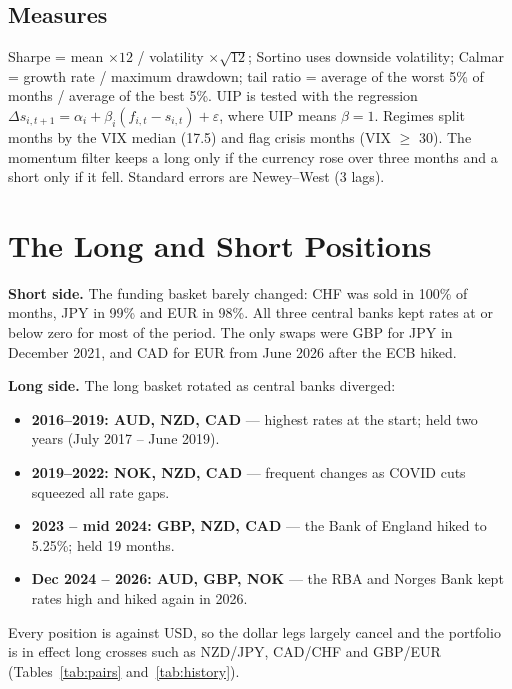 \documentclass[11pt,a4paper]{article}
\begin{document}
\subsection{Measures}
Sharpe = mean $\times12$ / volatility $\times\sqrt{12}$; Sortino uses downside volatility; Calmar = growth rate / maximum
drawdown; tail ratio = average of the worst 5\% of months / average of the best 5\%. UIP is tested with the
\citet{fama1984} regression $\Delta s_{i,t+1} = \alpha_i + \beta_i (f_{i,t} - s_{i,t}) + \varepsilon$, where UIP means
$\beta = 1$. Regimes split months by the VIX median (17.5) and flag crisis months (VIX $\geq$ 30). The momentum filter keeps a
long only if the currency rose over three months and a short only if it fell. Standard errors are Newey--West (3 lags).

\section{The Long and Short Positions}
\textbf{Short side.} The funding basket barely changed: CHF was sold in 100\% of months, JPY in 99\% and EUR in 98\%. All
three central banks kept rates at or below zero for most of the period. The only swaps were GBP for JPY in December 2021,
and CAD for EUR from June 2026 after the ECB hiked.

\textbf{Long side.} The long basket rotated as central banks diverged:
\begin{itemize}\setlength{\itemsep}{0pt}
\item \textbf{2016--2019: AUD, NZD, CAD} --- highest rates at the start; held two years (July 2017 -- June 2019).
\item \textbf{2019--2022: NOK, NZD, CAD} --- frequent changes as COVID cuts squeezed all rate gaps.
\item \textbf{2023 -- mid 2024: GBP, NZD, CAD} --- the Bank of England hiked to 5.25\%; held 19 months.
\item \textbf{Dec 2024 -- 2026: AUD, GBP, NOK} --- the RBA and Norges Bank kept rates high and hiked again in 2026.
\end{itemize}
Every position is against USD, so the dollar legs largely cancel and the portfolio is in effect long crosses such as NZD/JPY,
CAD/CHF and GBP/EUR (Tables~\ref{tab:pairs} and~\ref{tab:history}).
\end{document}

